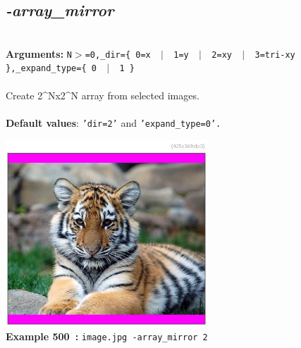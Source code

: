 \documentclass[a4paper,11pt,twoside]{book}
\begin{document}
\subsection{\emph{-array\_mirror} }\vspace*{-0.5em}
~\\\textbf{Arguments: } 
{\small \texttt{N$>$=0,\_dir=\{ 0=x ~$|$~ 1=y ~$|$~ 2=xy ~$|$~ 3=tri-xy \},\_expand\_type=\{ 0 ~$|$~ 1 \}}}\\~\\
Create 2\textasciicircum Nx2\textasciicircum N array from selected images.
~\\~\\\textbf{Default values}: {\small \texttt{'dir=2'} and \texttt{'expand\_type=0'.}}
\begin{center}\includegraphics[keepaspectratio=true,height=7cm,width=\textwidth]{img/gmic_def500.jpg}\\
{\footnotesize \textbf{Example 500~:} \texttt{image.jpg -array\_mirror 2}}
\end{center}
\end{document}
